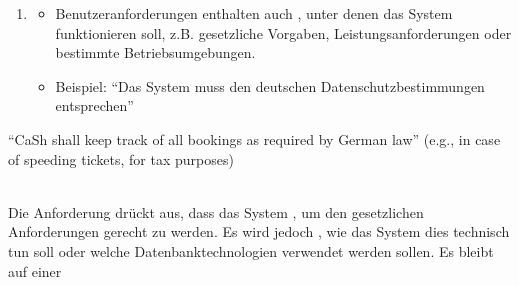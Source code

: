 \begin{infoBox}
\begin{enumerate}
\begin{itemize}
            \item Beispiel: \enquote{Das System soll es Benutzern ermöglichen, Flugtickets online zu buchen.}
        \end{itemize}
        \item {}
        \begin{itemize}
            \item Benutzeranforderungen enthalten auch , unter denen das System funktionieren soll, z.B. gesetzliche Vorgaben, Leistungsanforderungen oder bestimmte Betriebsumgebungen.
            \item Beispiel: \enquote{Das System muss den deutschen Datenschutzbestimmungen entsprechen}
        \end{itemize}
    \end{enumerate}
\end{infoBox}
\begin{defBox}[title=Example]
	\enquote{CaSh shall keep track of all bookings as required by German law} (e.g., in case of speeding tickets, for tax purposes)
\end{defBox}
\begin{infoBox}
    \\
    Die Anforderung drückt aus, dass das System , um den gesetzlichen Anforderungen gerecht zu werden. Es wird jedoch , wie das System dies technisch tun soll oder welche Datenbanktechnologien verwendet werden sollen. Es bleibt auf einer 
\end{infoBox}

\clearpage
